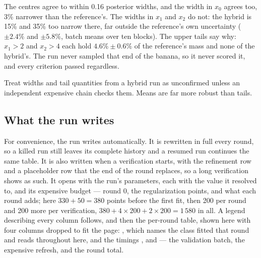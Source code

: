 The centres agree to within 0.16 posterior widths, and the width in $x_0$ agrees too, 3\% narrower
than the reference's. The widths in $x_1$ and $x_2$ do not: the hybrid is 15\% and 35\% too narrow
there, far outside the reference's own uncertainty ($\pm 2.4\%$ and $\pm 5.8\%$, batch means over ten
blocks). The upper tails say why: $x_1 > 2$ and $x_2 > 4$ each hold $4.6\% \pm 0.6\%$ of the
reference's mass and none of the hybrid's. The run never sampled that end of the banana, so it never
scored it, and every criterion passed regardless.

\begin{cautionbox}
Treat widths and tail quantities from a hybrid run as unconfirmed unless an independent expensive
chain checks them. Means are far more robust than tails.
\end{cautionbox}

\subsection{What the run writes}
\label{sec:hybrid-diagnostics}

For convenience, the run writes  automatically. It is
rewritten in full every round, so a killed run still leaves its complete history and a resumed run
continues the same table. It is also written when a verification starts, with the refinement row and
a placeholder  row that the end of the round replaces, so a long verification
shows as such. It opens with the run's parameters, each  with the value it resolved to,
and its expensive budget --- round 0, the regularization points, and what each round adds; here
$330 + 50 = 380$ points before the first fit, then 200 per round and 200 more per verification,
$380 + 4\times 200 + 2\times 200 = 1\,580$ in all. A legend describing every column follows, and
then the per-round table, shown here with four columns dropped to fit the page: ,
which names the class fitted that round and reads  throughout here, and the
timings ,  and  --- the validation batch, the
expensive refresh, and the round total.

